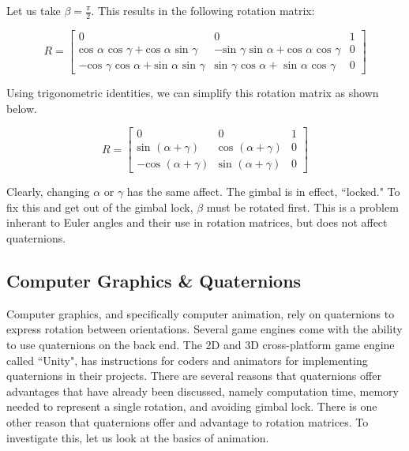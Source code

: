 Let us take $\beta= \frac{\pi}{2}$.
This results in the following rotation matrix:

$$
R =
\begin{bmatrix}
0 & 0 & 1 \\
\text{cos }\alpha  \text{ cos }\gamma + \text{cos }\alpha \text{ sin }\gamma 	& - \text{sin }\gamma \text{ sin }\alpha + \text{cos }\alpha \text{ cos }\gamma& 0 \\
 -\text{cos }\gamma \text{ cos }\alpha + \text{sin }\alpha \text{ sin }\gamma 		& \text{sin }\gamma \text{ cos } \alpha + \text{ sin }\alpha \text{ cos } \gamma  & 0
\end{bmatrix}
$$

Using trigonometric identities, we can simplify this rotation matrix as shown below.

$$
R =
\begin{bmatrix}
0 & 0 & 1 \\
\text{sin }(\alpha + \gamma) 	& \text{cos }(\alpha + \gamma) & 0 \\
-\text{cos }(\alpha + \gamma) 	& \text{sin }(\alpha + \gamma)   & 0
\end{bmatrix}
$$

Clearly, changing $\alpha$ or $\gamma$ has the same affect.
The gimbal is in effect, ``locked."
To fix this and get out of the gimbal lock, $\beta$ must be rotated first.
This is a problem inherant to Euler angles and their use in rotation matrices, but does not affect quaternions.

\subsection{Computer Graphics \& Quaternions}

Computer graphics, and specifically computer animation, rely on quaternions to express rotation between orientations.
Several game engines come with the ability to use quaternions on the back end.
The 2D and 3D cross-platform game engine called ``Unity", has instructions for coders and animators for implementing quaternions in their projects.
There are several reasons that quaternions offer advantages that have already been discussed, namely computation time, memory needed to represent a single rotation, and avoiding gimbal lock.
There is one other reason that quaternions offer and advantage to rotation matrices.
To investigate this, let us look at the basics of animation.
